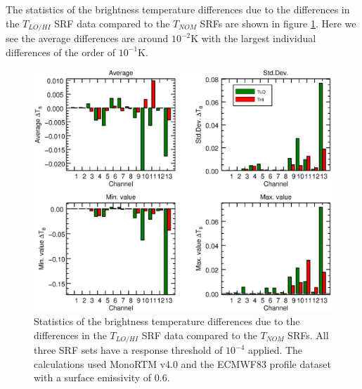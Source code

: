 The statistics of the brightness temperature differences due to the differences in the $T_{LO/HI}$ SRF data compared to the $T_{NOM}$ SRFs are shown in figure \ref{fig:TLO-THI_dTb_stats}. Here we see the average differences are around $10^{-2}$K with the largest individual differences of the order of $10^{-1}$K.

\begin{figure}[H]
  \centering
  \includegraphics[scale=0.75]{graphics/TLO-THI_dTb_stats.eps}
  \caption{Statistics of the brightness temperature differences due to the differences in the $T_{LO/HI}$ SRF data compared to the $T_{NOM}$ SRFs. All three SRF sets have a response threshold of $10^{-4}$ applied. The calculations used MonoRTM v4.0 and the ECMWF83 profile dataset with a surface emissivity of 0.6.}
  \label{fig:TLO-THI_dTb_stats}
\end{figure}


\clearpage




\begin{appendix}
  
\end{appendix}



